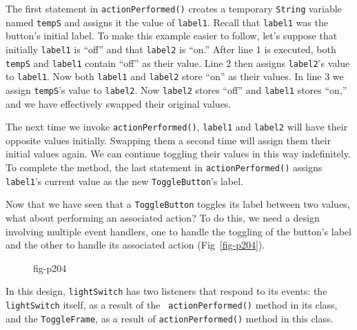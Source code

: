 
\noindent The first statement in {\tt actionPerformed()} creates a temporary
{\tt String} variable named {\tt tempS} and assigns it the value of
{\tt label1}. Recall that \mbox{\tt label1} was the button's initial
label.  To make this example easier to follow, let's suppose that
initially {\tt label1} is ``off'' and that {\tt label2} is ``on.'' 
After line 1 is executed, both {\tt tempS} and {\tt label1}
contain ``off'' as their value.  Line 2 then assigns {\tt label2}'s
value to {\tt label1}.  Now both {\tt label1} and {\tt label2}
store ``on'' as their values.   In line 3 we assign {\tt tempS}'s value
to {\tt label2}. Now {\tt label2} stores ``off'' and {\tt label1}
stores ``on,'' and we have effectively swapped their original values.

The next time we invoke {\tt actionPerformed()}, {\tt label1}
and {\tt label2} will have their opposite values initially.  
Swapping them a second time will assign them their initial values
again.  We can continue toggling their values in this way
indefinitely.  To complete the method, the last statement in
{\tt actionPerformed()} assigns {\tt label1}'s current value as the new
{\tt ToggleButton}'s label.

Now that we have seen that a {\tt ToggleButton} toggles its label
between two values, what about performing an associated action?
 To do this, we need a design
involving multiple event handlers, one to handle the toggling of the
button's label and the other to handle its associated action
(Fig~\ref{fig-p204}).
\begin{figure}[h!]
{fig-p204}
\end{figure}
In this design, {\tt lightSwitch} has two listeners that respond to
its events: the {\tt lightSwitch} itself, as a result of the {\tt
actionPerformed()} method in its class, and the {\tt ToggleFrame}, as
a result of {\tt actionPerformed()} method in this class.


